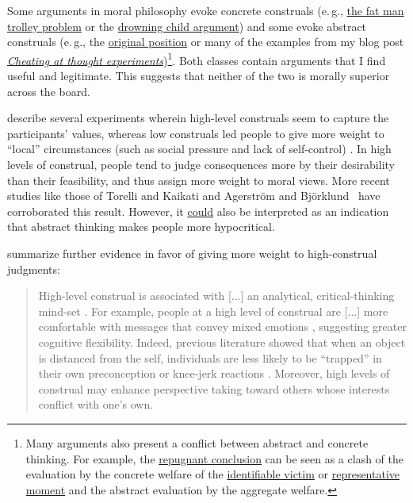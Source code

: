 Some arguments in moral philosophy evoke concrete construals (e.\,g.,
\href{https://en.wikipedia.org/wiki/Trolley_problem\#The_fat_man}{the
fat man trolley problem} or the
\href{https://en.wikipedia.org/wiki/Famine,_Affluence,_and_Morality}{drowning
child argument}) and some evoke abstract construals (e.\,g., the
\href{https://en.wikipedia.org/wiki/Original_position}{original
position} or many of the examples from my blog post
\href{https://casparoesterheld.com/2015/12/06/cheating-at-thought-experiments/}{\emph{Cheating
at thought experiments}})\footnote{Many arguments also present a
  conflict between abstract and concrete thinking. For example, the
  \href{https://en.wikipedia.org/wiki/Mere_addition_paradox}{repugnant
  conclusion} can be seen as a clash of the evaluation by the concrete
  welfare of the
  \href{https://en.wikipedia.org/wiki/Identifiable_victim_effect}{identifiable
  victim} or
  \href{https://en.wikipedia.org/wiki/Peak\%E2\%80\%93end_rule}{representative
  moment} and the abstract evaluation by the aggregate welfare.}. Both
classes contain arguments that I find useful and legitimate. This
suggests that neither of the two is morally superior across the board.

\citet[section VI]{trope2010construal} describe several experiments
wherein high-level construals seem to capture the participants' values,
whereas low construals led people to give more weight to ``local''
circumstances (such as social pressure and lack of self-control) \parencite[cf.\,][section VII, subsection ``Affect'']{trope2010construal}. In high
levels of construal, people tend to judge consequences more by their
desirability than their feasibility, and thus assign more weight to
moral views. More recent studies like those of Torelli and Kaikati 
\citeyear{Torelli2009-mw} and Agerström and Björklund~
\citeyear{Agerstrom2013-ep} have corroborated this result.
However, it
\href{http://www.overcomingbias.com/2010/05/far-is-hypocritical.html}{could}
also be interpreted as an indication that abstract thinking makes people
more hypocritical.

\citet{yang2013polarized} summarize further evidence in favor of
giving more weight to high-construal judgments:

\begin{quote}
High-level construal is associated with {[}...{]} an analytical,
critical-thinking mind-set \parencite{Torelli2009-mw}. For example, people at a high level of construal
are {[}...{]} more comfortable with messages that convey mixed emotions \parencite{hong2010feeling}, suggesting greater cognitive flexibility. Indeed,
previous literature showed that when an object is distanced from the
self, individuals are less likely to be ``trapped'' in their own
preconception or knee-jerk reactions \parencite{kross2012boosting}. Moreover, high levels of
construal may enhance perspective taking toward others whose interests conflict with one's own.
\end{quote}

